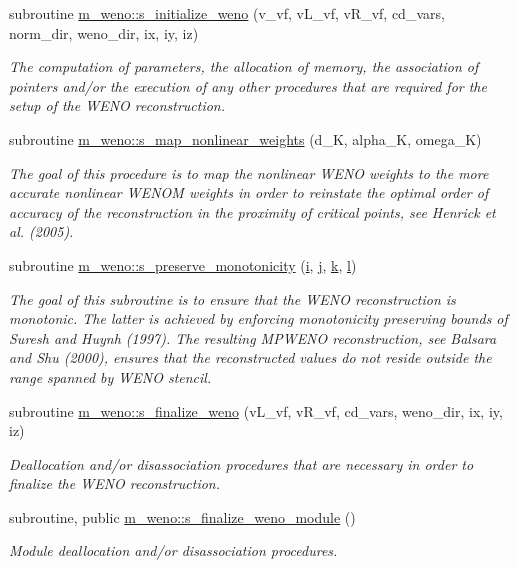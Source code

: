 \begin{DoxyCompactItemize}
subroutine \hyperlink{namespacem__weno_aa2c34f80dbff64204b9fcf65a1bc137a}{m\+\_\+weno\+::s\+\_\+initialize\+\_\+weno} (v\+\_\+vf, v\+L\+\_\+vf, v\+R\+\_\+vf, cd\+\_\+vars, norm\+\_\+dir, weno\+\_\+dir, ix, iy, iz)
\begin{DoxyCompactList}\small\item\em The computation of parameters, the allocation of memory, the association of pointers and/or the execution of any other procedures that are required for the setup of the W\+E\+NO reconstruction. \end{DoxyCompactList}\item 
subroutine \hyperlink{namespacem__weno_a29eef65904f4b97e708c3ff282737937}{m\+\_\+weno\+::s\+\_\+map\+\_\+nonlinear\+\_\+weights} (d\+\_\+K, alpha\+\_\+K, omega\+\_\+K)
\begin{DoxyCompactList}\small\item\em The goal of this procedure is to map the nonlinear W\+E\+NO weights to the more accurate nonlinear W\+E\+N\+OM weights in order to reinstate the optimal order of accuracy of the reconstruction in the proximity of critical points, see Henrick et al. (2005). \end{DoxyCompactList}\item 
subroutine \hyperlink{namespacem__weno_afc956598e9b022de4638837cd2556546}{m\+\_\+weno\+::s\+\_\+preserve\+\_\+monotonicity} (\hyperlink{m__rhs_8f90_aaea4baed8fd8b780f6938f0dc1fb0f72}{i}, \hyperlink{m__rhs_8f90_aeadbc0ce9b66517f8fde156199772ec1}{j}, \hyperlink{m__rhs_8f90_af22c486581933c52df7d4aa306382074}{k}, \hyperlink{m__rhs_8f90_a2ac747380de0e6e5e11b01f4137fb75c}{l})
\begin{DoxyCompactList}\small\item\em The goal of this subroutine is to ensure that the W\+E\+NO reconstruction is monotonic. The latter is achieved by enforcing monotonicity preserving bounds of Suresh and Huynh (1997). The resulting M\+P\+W\+E\+NO reconstruction, see Balsara and Shu (2000), ensures that the reconstructed values do not reside outside the range spanned by W\+E\+NO stencil. \end{DoxyCompactList}\item 
subroutine \hyperlink{namespacem__weno_a8657e638f74f9aa565fd794dd0c18eb9}{m\+\_\+weno\+::s\+\_\+finalize\+\_\+weno} (v\+L\+\_\+vf, v\+R\+\_\+vf, cd\+\_\+vars, weno\+\_\+dir, ix, iy, iz)
\begin{DoxyCompactList}\small\item\em Deallocation and/or disassociation procedures that are necessary in order to finalize the W\+E\+NO reconstruction. \end{DoxyCompactList}\item 
subroutine, public \hyperlink{namespacem__weno_a2e2bca630c0e8e8afac63e905f23783c}{m\+\_\+weno\+::s\+\_\+finalize\+\_\+weno\+\_\+module} ()
\begin{DoxyCompactList}\small\item\em Module deallocation and/or disassociation procedures. \end{DoxyCompactList}\end{DoxyCompactItemize}
